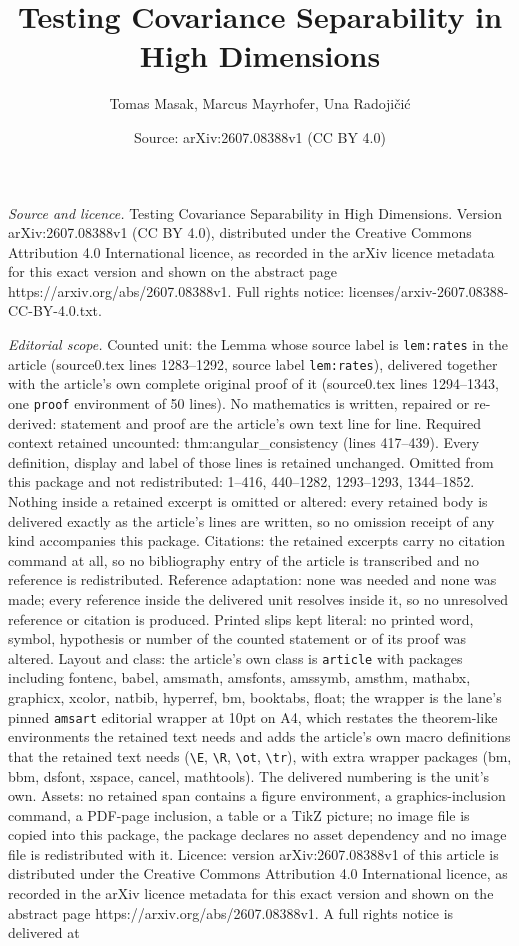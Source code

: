\documentclass[10pt,a4paper]{amsart}
\title[Testing Covariance Separability in High Dimensions]{Testing Covariance Separability in High Dimensions}
\author{Tomas Masak, Marcus Mayrhofer, Una Radoji\v{c}i\'c}
\date{Source: arXiv:2607.08388v1 (CC BY 4.0)}
\begin{document}
\maketitle

\noindent\emph{Source and licence.} Testing Covariance Separability in High Dimensions. Version arXiv:2607.08388v1 (CC BY 4.0), distributed under the Creative Commons Attribution 4.0 International licence, as recorded in the arXiv licence metadata for this exact version and shown on the abstract page https://arxiv.org/abs/2607.08388v1. Full rights notice: licenses/arxiv-2607.08388-CC-BY-4.0.txt.\par\smallskip

\noindent\textit{Editorial scope.} Counted unit: the Lemma whose source label is \texttt{lem:rates} in the article (source0.tex lines 1283--1292, source label \texttt{lem:rates}), delivered together with the article's own complete original proof of it (source0.tex lines 1294--1343, one \texttt{proof} environment of 50 lines). No mathematics is written, repaired or re-derived: statement and proof are the article's own text line for line. Required context retained uncounted: thm:angular\_consistency (lines 417--439). Every definition, display and label of those lines is retained unchanged. Omitted from this package and not redistributed: 1--416, 440--1282, 1293--1293, 1344--1852. Nothing inside a retained excerpt is omitted or altered: every retained body is delivered exactly as the article's lines are written, so no omission receipt of any kind accompanies this package. Citations: the retained excerpts carry no citation command at all, so no bibliography entry of the article is transcribed and no reference is redistributed. Reference adaptation: none was needed and none was made; every reference inside the delivered unit resolves inside it, so no unresolved reference or citation is produced. Printed slips kept literal: no printed word, symbol, hypothesis or number of the counted statement or of its proof was altered. Layout and class: the article's own class is \texttt{article} with packages including fontenc, babel, amsmath, amsfonts, amssymb, amsthm, mathabx, graphicx, xcolor, natbib, hyperref, bm, booktabs, float; the wrapper is the lane's pinned \texttt{amsart} editorial wrapper at 10pt on A4, which restates the theorem-like environments the retained text needs and adds the article's own macro definitions that the retained text needs (\texttt{\textbackslash E}, \texttt{\textbackslash R}, \texttt{\textbackslash ot}, \texttt{\textbackslash tr}), with extra wrapper packages (bm, bbm, dsfont, xspace, cancel, mathtools). The delivered numbering is the unit's own. Assets: no retained span contains a figure environment, a graphics-inclusion command, a PDF-page inclusion, a table or a TikZ picture; no image file is copied into this package, the package declares no asset dependency and no image file is redistributed with it. Licence: version arXiv:2607.08388v1 of this article is distributed under the Creative Commons Attribution 4.0 International licence, as recorded in the arXiv licence metadata for this exact version and shown on the abstract page https://arxiv.org/abs/2607.08388v1. A full rights notice is delivered at 
\end{document}
